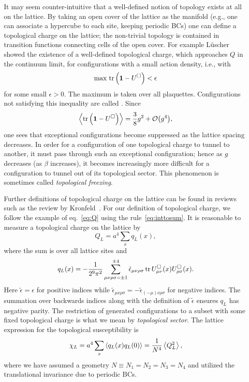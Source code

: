It may seem counter-intuitive that a well-defined notion of topology
exists at all on the lattice. By taking an open cover of the
lattice as the manifold (e.g., one can associate a hypercube to
each site, keeping periodic BCs) one can define a topological charge on the 
lattice; the non-trivial topology is contained in transition functions
connecting cells of the open cover. For example 
L\"uscher~\cite{luscher_topology_1982} showed
the existence of a well-defined topological charge, which approaches 
$Q$ in the continuum limit, for configurations with a small action
density, i.e., with
\begin{equation}
  \max\,\tr\left({\mathbf 1}-U^\Box\right)<\epsilon
\end{equation}
for some small $\epsilon>0$. The maximum is taken over all plaquettes.
Configurations not satisfying this inequality are called 
. 
Since
\begin{equation}
  \ev{\tr\left(\id-U^\Box\right)}=\frac{3}{8}g^2+\order{g^4},
\end{equation} 
one sees that exceptional configurations become suppressed 
as the lattice spacing
decreases. In order for a configuration of one topological charge to
tunnel to another, it must pass through such an exceptional configuration;
hence as $g$ decreases (as $\beta$ increases), it becomes increasingly 
more difficult for a configuration to tunnel out of its topological sector. 
This phenomenon is sometimes called {\it topological freezing}.

Further definitions of topological charge on the lattice can be found 
in reviews such as the review by Kronfeld~\cite{kronfeld_topological_1988}.
For our definition of topological charge, we follow the example of 
eq.~\eqref{eq:Q} using the rule~\eqref{eq:inttosum}. It is reasonable to 
measure a topological charge on the lattice by
\begin{equation}\label{eq:QL}
  Q_L=a^4\sum_x q_L(x),
\end{equation}
where the sum is over all lattice sites and
\begin{equation}\label{eq:QLdensity}
  q_L(x) = -\frac{1}{2^9\pi^2}\sum\limits_{\mu\nu\rho\sigma=\pm 1}^{\pm 4}
         \tilde{\epsilon}_{\mu\nu\rho\sigma}
         \tr U^\Box_{\mu\nu}(x)U^\Box_{\rho\sigma}(x).
\end{equation}
Here $\tilde{\epsilon}=\epsilon$ for positive indices while
$\tilde{\epsilon}_{\mu\nu\rho\sigma}=
  -\tilde{\epsilon}_{(-\mu)\nu\rho\sigma}$ for negative indices.
The summation over backwards indices along with the definition of
$\tilde{\epsilon}$ ensures $q_L$ has negative parity.
The restriction of generated configurations to a subset with some fixed
topological charge is what we mean by 
{\it topological sector}.
The lattice expression for the topological susceptibility is
\begin{equation}
  \chi_L=a^4\sum_x\ev{q_L(x)q_L(0)}=\frac{1}{N^4}\ev{Q_L^2},
\end{equation}
where we have assumed a geometry $N\equiv N_1=N_2=N_3=N_4$
and utilized the translational invariance due to periodic BCs.

